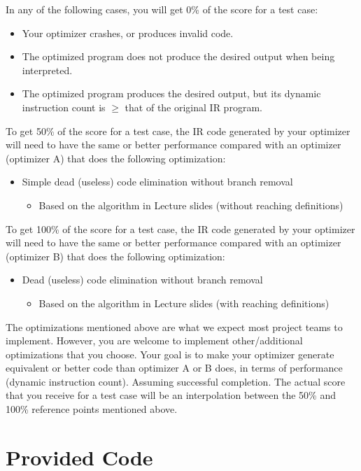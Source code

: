 \documentclass[12pt]{article}
\begin{document}
In any of the following cases, you will get 0\% of the score for a test case:
\begin{itemize}
\item Your optimizer crashes, or produces invalid code.
\item The optimized program does not produce the desired output when
  being interpreted.
\item The optimized program produces the desired output, but its
  dynamic instruction count is $\geq$ that of the original IR program.
\end{itemize}

To get 50\% of the score for a test case, the IR code generated by your optimizer will need to have the same or better performance compared with an optimizer (optimizer A) that does the following optimization:
\begin{itemize}
\item Simple dead (useless) code elimination without branch removal
\begin{itemize}
\item Based on the algorithm in Lecture slides (without reaching definitions)
\end{itemize}
\end{itemize}

To get 100\% of the score for a test case, the IR code generated by
your optimizer will need to have the same or better performance
compared with an optimizer (optimizer B) that does the following
optimization:
\begin{itemize}
\item Dead (useless) code elimination without branch removal
\begin{itemize}
\item Based on the algorithm in  Lecture slides (with reaching definitions)
\end{itemize}
\end{itemize}


The optimizations mentioned above are what we expect most project
teams to implement.  However, you are welcome to implement other/additional
optimizations that you choose.  
Your goal is to make your optimizer generate equivalent or better code than
optimizer A or B does,
in terms of performance (dynamic instruction count).  Assuming
successful completion.  The actual score
that you receive for a test case will be an interpolation between the
50\% and 100\% reference points mentioned above.

\section{Provided Code}\label{sec:code}
\end{document}
